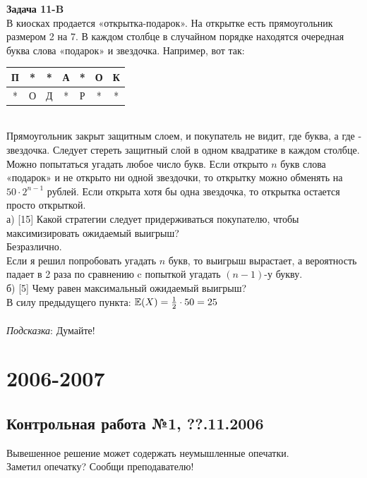 \documentclass[12pt, a4paper]{article}\usepackage[]{graphicx}\usepackage[]{color}
\begin{document}
{\bf Задача 11-B} \\
В киосках продается «открытка-подарок». На открытке есть
прямоугольник размером 2 на 7. В каждом столбце в случайном
порядке находятся очередная буква слова «подарок» и звездочка.
Например, вот так: \\
\begin{tabular}{|c|c|c|c|c|c|c|}
  \hline
  П & * & * & А & * & О & К \\
  \hline
  * & О & Д & * & Р & * & * \\
  \hline
\end{tabular} \\
Прямоугольник закрыт защитным слоем, и покупатель не видит, где
буква, а где - звездочка. Следует стереть защитный слой в одном
квадратике в каждом столбце. Можно попытаться угадать любое число
букв. Если открыто $n$ букв слова «подарок» и не открыто ни одной
звездочки, то открытку можно обменять на $50\cdot 2^{n-1}$ рублей.
Если открыта хотя бы одна звездочка, то открытка
остается просто открыткой. \\
а) [15] Какой стратегии следует придерживаться покупателю, чтобы
максимизировать ожидаемый выигрыш? \\
Безразлично. \\
Если я решил попробовать угадать $n$ букв, то выигрыш вырастает, а
вероятность падает в 2 раза по сравнению c попыткой угадать $(n-1)$-у букву.  \\
б) [5] Чему равен максимальный ожидаемый выигрыш? \\
В силу предыдущего пункта: $\mathbb{E}(X)=\frac{1}{2}\cdot 50=25$ \\ \\
\emph{Подсказка}: Думайте! \\




\section{2006-2007}




\subsection{Контрольная работа №1, ??.11.2006}

Вывешенное решение может содержать неумышленные опечатки. \\
Заметил опечатку? Сообщи преподавателю! \\
\end{document}
